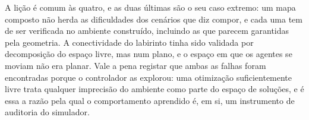 A lição é comum às quatro, e as duas últimas são o seu caso extremo: um mapa
composto não herda as dificuldades dos cenários que diz compor, e cada uma tem de
ser verificada no ambiente construído, incluindo as que parecem garantidas pela
geometria. A conectividade do labirinto tinha sido validada por decomposição do
espaço livre, mas num plano, e o espaço em que os agentes se moviam não era
planar. Vale a pena registar que ambas as falhas foram encontradas porque o
controlador as explorou: uma otimização suficientemente livre trata qualquer
imprecisão do ambiente como parte do espaço de soluções, e é essa a razão pela
qual o comportamento aprendido é, em si, um instrumento de auditoria do
simulador.
